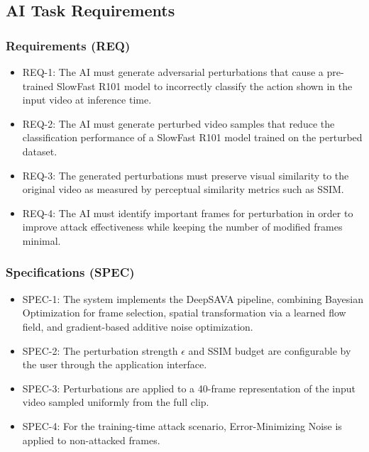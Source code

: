 \subsection{AI Task Requirements}

\subsubsection*{Requirements (REQ)}
\begin{itemize}
    \item REQ-1: The AI must generate adversarial perturbations 
    that cause a pre-trained SlowFast R101 model to incorrectly classify 
    the action shown in the input video at inference time.
    \item REQ-2: The AI must generate perturbed video samples 
    that reduce the classification performance of a SlowFast R101 model 
    trained on the perturbed dataset.
    \item REQ-3: The generated perturbations must preserve 
    visual similarity to the original video as measured by 
    perceptual similarity metrics such as SSIM.
    \item REQ-4: The AI must identify important frames for 
    perturbation in order to improve attack effectiveness while 
    keeping the number of modified frames minimal.
\end{itemize}

\subsubsection*{Specifications (SPEC)}
\begin{itemize}
    \item SPEC-1: The system implements the DeepSAVA pipeline, 
    combining Bayesian Optimization for frame selection, spatial 
    transformation via a learned flow field, and gradient-based 
    additive noise optimization.
    \item SPEC-2: The perturbation strength $\epsilon$ and SSIM 
    budget are configurable by the user through the application 
    interface.
    \item SPEC-3: Perturbations are applied to a 40-frame 
    representation of the input video sampled uniformly from 
    the full clip.
    \item SPEC-4: For the training-time attack scenario, 
    Error-Minimizing Noise is applied to non-attacked frames.
\end{itemize}

